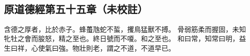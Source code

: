 ﻿%
%

\chapter{~}

\section{原道德經第五十五章（未校註）}

\begin{withgezhu}

\zhsong


含德之厚者，比於赤子。\textcolor{tongjia-color}{蜂蠆虺蛇不蜇，攫鳥猛獸不搏}。
骨弱筋柔而握固，未知牝牡之會而朘怒，精之至也。終日號而不嗄。和之至也。
和曰常，知常曰明，益生曰祥，心使氣曰強。物壯則老，謂之不道，不道早已。

\end{withgezhu}

